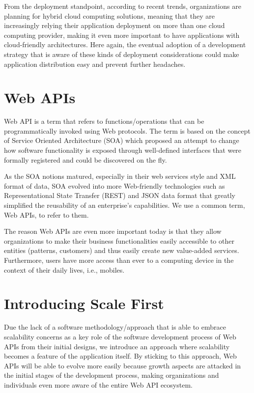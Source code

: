 \documentclass[10pt,article]{IEEEtran}
\begin{document}
From the deployment standpoint, according to recent trends, organizations are planning for hybrid cloud computing solutions, meaning that they are increasingly relying their application deployment on more than one cloud computing provider\cite{rightscale}, making it even more important to have applications with cloud-friendly architectures. Here again, the eventual adoption of a development strategy that is aware of these kinds of deployment considerations could make application distribution easy and prevent further headaches.
 

\section{Web APIs}
Web API is a term that refers to functions/operations that can be programmatically invoked using Web protocols. The term is based on the concept of Service Oriented Architecture (SOA) which proposed an attempt to change how software functionality is exposed through well-defined interfaces that were formally registered and could be discovered on the fly.

As the SOA notions matured, especially in their web services style and XML format of data, SOA evolved into more Web-friendly technologies such as Representational State Transfer (REST) and JSON data format that greatly simplified the reusability of an enterprise's capabilities. We use a common term, Web APIs, to refer to them.

The reason Web APIs are even more important today is that they allow organizations to make their business functionalities easily accessible  to  other  entities  (patterns,  customers)  and  thus  easily create new value-added services. Furthermore, users have more access than ever to a computing  device  in  the  context  of  their  daily  lives, i.e., mobiles.\cite{webapi:definition}

\section{Introducing Scale First}
Due the lack of a software methodology/approach that is able to embrace scalability concerns as a key role of the software development process of Web APIs from their initial designs, we introduce an approach where scalability becomes a feature of the application itself. By sticking to this approach, Web APIs will be able to evolve more easily because growth aspects are attacked in the initial stages of the development process, making organizations and individuals even more aware of the entire Web API ecosystem.
\end{document}
